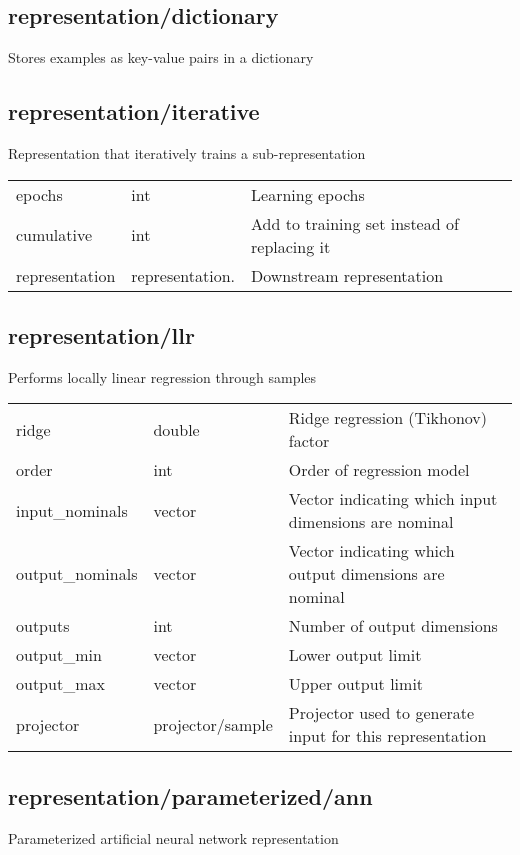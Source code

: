 \subsection{representation/dictionary}
\noindent Stores examples as key-value pairs in a dictionary\\

\subsection{representation/iterative}
\noindent Representation that iteratively trains a sub-representation\\

\noindent\begin{tabular}{@{}lll@{}}
epochs&int&Learning epochs\\
cumulative&int&Add to training set instead of replacing it\\
representation&representation.&Downstream representation\\
\end{tabular}
\subsection{representation/llr}
\noindent Performs locally linear regression through samples\\

\noindent\begin{tabular}{@{}lll@{}}
ridge&double&Ridge regression (Tikhonov) factor\\
order&int&Order of regression model\\
input\_nominals&vector&Vector indicating which input dimensions are nominal\\
output\_nominals&vector&Vector indicating which output dimensions are nominal\\
outputs&int&Number of output dimensions\\
output\_min&vector&Lower output limit\\
output\_max&vector&Upper output limit\\
projector&projector/sample&Projector used to generate input for this representation\\
\end{tabular}
\subsection{representation/parameterized/ann}
\noindent Parameterized artificial neural network representation\\

